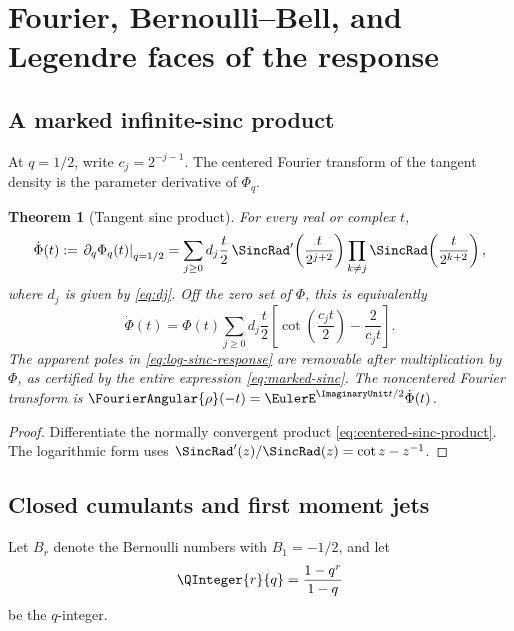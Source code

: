 \documentclass[11pt,oneside]{article}
\newtheorem{theorem}{Theorem}[section]
\theoremstyle{definition}
\theoremstyle{remark}
\begin{document}
\section{Fourier, Bernoulli--Bell, and Legendre faces of the response}
\label{sec:spectral}

\subsection{A marked infinite-sinc product}

At \(q=1/2\), write \(c_j=2^{-j-1}\).  The centered Fourier transform of the tangent density
is the parameter derivative of \(\Phi_q\).

\begin{theorem}[Tangent sinc product]
\label{thm:tangent-sinc}
For every real or complex \(t\),
\begin{equation}
 \dot\Phi(t):=\left.\partial_q\Phi_q(t)\right|_{q=1/2}
 =\sum_{j\ge0}d_j\frac t2\,
 \SincRad'\!\left(\frac{t}{2^{j+2}}\right)
 \prod_{k\ne j}\SincRad\!\left(\frac{t}{2^{k+2}}\right),
 \label{eq:marked-sinc}
\end{equation}
where \(d_j\) is given by \eqref{eq:dj}.  Off the zero set of \(\Phi\), this is equivalently
\begin{equation}
 \dot\Phi(t)=\Phi(t)
 \sum_{j\ge0}d_j\frac t2
 \left[
 \cot\!\left(\frac{c_jt}{2}\right)-\frac{2}{c_jt}
 \right].
 \label{eq:log-sinc-response}
\end{equation}
The apparent poles in \eqref{eq:log-sinc-response} are removable after multiplication by
\(\Phi\), as certified by the entire expression \eqref{eq:marked-sinc}.  The noncentered
Fourier transform is \(\FourierAngular{\rho}(-t)=\EulerE^{\ImaginaryUnit t/2}\dot\Phi(t)\).
\end{theorem}

\begin{proof}
Differentiate the normally convergent product \eqref{eq:centered-sinc-product}.  The logarithmic
form uses \(\SincRad'(z)/\SincRad(z)=\cot z-z^{-1}\).
\end{proof}

\subsection{Closed cumulants and first moment jets}

Let \(B_r\) denote the Bernoulli numbers with \(B_1=-1/2\), and let
\[
 \QInteger{r}{q}=\frac{1-q^r}{1-q}
\]
be the \(q\)-integer.
\end{document}
